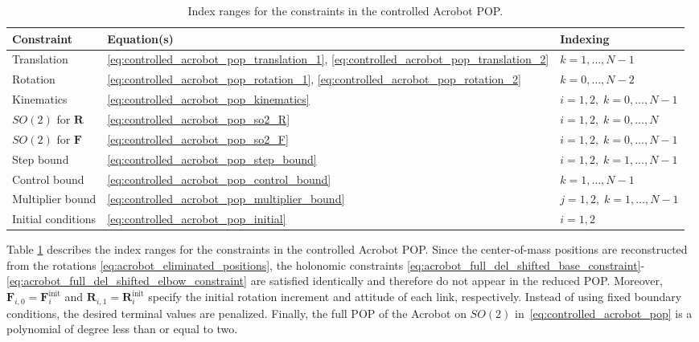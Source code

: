 \begin{table}[htbp]
\centering
\small
\caption{Index ranges for the constraints in the controlled Acrobot POP.}
\label{tab:controlled_acrobot_pop_indexing}
\begin{tabular}{@{}lll@{}}
\toprule
Constraint & Equation(s) & Indexing \\
\midrule
Translation
& \eqref{eq:controlled_acrobot_pop_translation_1},
  \eqref{eq:controlled_acrobot_pop_translation_2}
& \(k=1,\ldots,N-1\) \\
Rotation
& \eqref{eq:controlled_acrobot_pop_rotation_1},
  \eqref{eq:controlled_acrobot_pop_rotation_2}
& \(k=0,\ldots,N-2\) \\
Kinematics
& \eqref{eq:controlled_acrobot_pop_kinematics}
& \(i=1,2,\; k=0,\ldots,N-1\) \\
\(SO(2)\) for \(\bm{R}\)
& \eqref{eq:controlled_acrobot_pop_so2_R}
& \(i=1,2,\; k=0,\ldots,N\) \\
\(SO(2)\) for \(\bm{F}\)
& \eqref{eq:controlled_acrobot_pop_so2_F}
& \(i=1,2,\; k=0,\ldots,N-1\) \\
Step bound
& \eqref{eq:controlled_acrobot_pop_step_bound}
& \(i=1,2,\; k=1,\ldots,N-1\) \\
Control bound
& \eqref{eq:controlled_acrobot_pop_control_bound}
& \(k=1,\ldots,N-1\) \\
Multiplier bound
& \eqref{eq:controlled_acrobot_pop_multiplier_bound}
& \(j=1,2,\; k=1,\ldots,N-1\) \\
Initial conditions
& \eqref{eq:controlled_acrobot_pop_initial}
& \(i=1,2\) \\
\bottomrule
\end{tabular}
\end{table}
Table \ref{tab:controlled_acrobot_pop_indexing} describes the index ranges for the constraints in the controlled Acrobot POP.
Since the center-of-mass positions are reconstructed from the rotations \eqref{eq:acrobot_eliminated_positions},
the holonomic constraints \eqref{eq:acrobot_full_del_shifted_base_constraint}-\eqref{eq:acrobot_full_del_shifted_elbow_constraint}
are satisfied identically and therefore do not appear in the reduced POP.
Moreover, $\bm{F}_{i,0}=\bm{F}_i^{\mathrm{init}}$ and
$\bm{R}_{i,1}=\bm{R}_i^{\mathrm{init}}$ specify the initial rotation increment and attitude of each link, respectively.
Instead of using fixed boundary conditions, the desired terminal values are penalized. 
Finally, the full POP of the Acrobot on $SO(2)$ in~\eqref{eq:controlled_acrobot_pop} 
is a polynomial of degree less than or equal to two.

